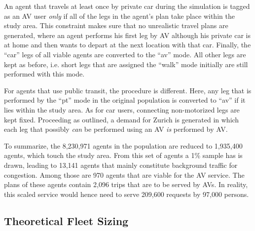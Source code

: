 
An agent that travels at least once by private car during the simulation is tagged
as an AV user \textit{only} if all of the legs in the agent's plan take place
within the study area. This constraint makes sure that no unrealistic travel
plans are generated, where an agent performs his first leg by AV although his
private car is at home and then wants to depart at the next location with that
car. Finally, the ``car'' legs of all viable agents are converted to the ``av'' mode.
All other legs are kept as before, i.e. short legs that are assigned the ``walk''
mode initially are still performed with this mode.

For agents that use public transit, the procedure is different. Here, any leg
that is performed by the ``pt'' mode in the original population is converted to ``av''
if it lies within the study area. As for car users, connecting non-motorized
legs are kept fixed. Proceeding as outlined, a demand for Zurich is generated in which each leg that possibly
\textit{can} be performed using an AV \textit{is} performed by AV.

To summarize, the 8,230,971 agents in the population are reduced to
1,935,400 agents, which touch the study area. From this set of agents
a 1\% sample has is drawn, leading to 13,141 agents that mainly constitute
background traffic for congestion. Among those are 970 agents that are viable for the AV
service. The plans of these agents contain 2,096 trips that are to be served by
AVs. In reality, this scaled service would hence need to serve 209,600 requests by
97,000 persons.

\subsection{Theoretical Fleet Sizing}


